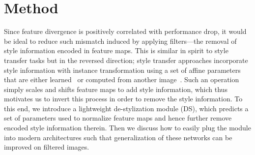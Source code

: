 \documentclass[letterpaper]{article} %
\newcommand{\instagram}{{\scshape ImageNet-Instagram}\xspace}
\newcommand{\imagenet}{{\scshape ImageNet}\xspace}
\begin{document}

\section{Method}
Since feature divergence is positively correlated with performance drop, it would be ideal to reduce such mismatch induced by applying filters---the removal of style information encoded in feature maps. This is similar in spirit to style transfer tasks but in the reversed direction; style transfer approaches incorporate style information with instance transformation using a set of affine parameters that are either learned~\cite{ulyanov2016instance} or computed from another image~\cite{huang2017adain}. Such an operation simply scales and shifts feature maps to add style information, which thus motivates us to invert this process in order to remove the style information. To this end, we introduce a lightweight de-stylization module (DS), which predicts a set of parameters used to normalize feature maps and hence further remove encoded style information therein. Then we discuss how to easily plug the module into modern architectures such that generalization of these networks can be improved on filtered images.
\end{document}
